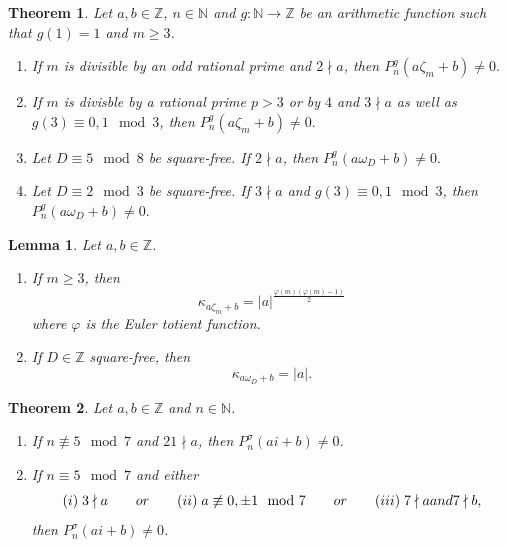 \documentclass[10pt,a4paper]{amsart}
\newtheorem{thm}{Theorem}
\newtheorem{lemma}{Lemma}
\newcommand{\N}{\mathbb{N}}
\newcommand{\Z}{\mathbb{Z}}
\begin{document}
\begin{thm}\label{thm:NonRootsTranslatingWithRationalIntegers}
    Let $a, b \in \Z$, $n \in \N$ and $g: \N \longrightarrow \Z$ be an arithmetic function such that $g(1) = 1$ and $m \geq 3$.
        \begin{enumerate}
            \item If $m$ is divisible by an odd rational prime and $2 \nmid a$, then
            $P_n^g(a\zeta_m + b) \neq 0.$
            \item If $m$ is divisble by a rational prime $p > 3$ or by $4$ and $3 \nmid a$ as well as $g(3) \equiv 0,1 \mod 3$, then
            $P_n^g(a\zeta_m + b) \neq 0.$
            \item Let $D \equiv 5 \mod 8$ be square-free. If $2 \nmid a$, then $P_n^g(a\omega_D + b) \neq 0.$
            \item Let $D \equiv 2 \mod 3$ be square-free. If $3 \nmid a$ and $g(3) \equiv 0, 1 \mod 3$, then
            $P_n^g(a\omega_D + b) \neq 0.$
        \end{enumerate}
\end{thm}

\begin{lemma}\label{lem:IndexOfaZeta_mAndaOmega_D}
    Let $a, b \in \Z$.
    \begin{enumerate}
        \item If $m \geq 3$, then
        \begin{equation*}
            \kappa_{a\zeta_m + b} = |a|^{\frac{\varphi(m)\left(\varphi(m) - 1\right)}{2}}
        \end{equation*}
        where $\varphi$ is the Euler totient function.
        \item If $D \in \Z$ square-free, then
        \begin{equation*}
            \kappa_{a\omega_D + b} = |a|. 
        \end{equation*}
    \end{enumerate}
\end{lemma}

\begin{thm}\label{thm:NonRootsOnImaginaryAxisWithSigma}
    Let $a, b \in \Z$ and $n \in \N$.
    \begin{enumerate}
        \item If $n \not \equiv 5 \mod 7$ and $21 \nmid a$, then $P_n^\sigma(ai + b) \neq 0$.
        \item If $n \equiv 5 \mod 7$ and either
        \begin{equation*}
            \textit{(i)} \; 3 \nmid a \qquad \textup{or} \qquad
            \textit{(ii)} \; a \not \equiv 0, \pm 1 \mod 7 \qquad \textup{or} \qquad
            \textit{(iii)} \; 7 \nmid a \textup{ and } 7 \nmid b,
        \end{equation*}
        then $P_n^\sigma(ai + b) \neq 0$.
    \end{enumerate}
\end{thm}
\end{document}
